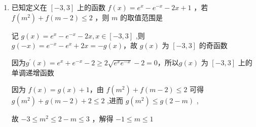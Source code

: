 \begin{enumerate}
        
        \item 已知定义在 $\left\lbrack  {-3,3}\right\rbrack$ 上的函数 $f\left( x\right)  = {{e}}^{x} - {{e}}^{-x} - {2x} + 1$ ，若 $f\left( {m}^{2}\right)  +  f\left( {m - 2}\right)  \leq  2$ ，则 $m$ 的取值范围是

        \begin{jieda}
            记 $g\left( x\right)  = {{e}}^{x} - {{e}}^{-x} - {2x},x \in  \left\lbrack  {-3,3}\right\rbrack$ ,则 $g\left( {-x}\right)  = {{e}}^{-x} - {{e}}^{x} + {2x} =  - g\left( x\right)$，故 $g\left( x\right)$ 为 $\left\lbrack  {-3,3}\right\rbrack$ 的奇函数
            
            因为${g}^{\prime }\left( x\right)  = {{e}}^{x} + {{e}}^{-x} - 2 \geq  2\sqrt{{{e}}^{x}{{e}}^{-x}} - 2 = 0$，所以$g\left( x\right)$ 为 $\left\lbrack  {-3,3}\right\rbrack$ 上的单调递增函数
            
            因为 $f\left( x\right)  = g\left( x\right)  + 1$，由 $f\left( {m}^{2}\right)  + f\left( {m - 2}\right)  \leq  2$ 可得 $g\left( {m}^{2}\right)  + g\left( {m - 2}\right)  + 2 \leq  2$ ,进而 $g\left( {m}^{2}\right)  \leq  g\left( {2 - m}\right)$ ,
            
            故 $- 3 \leq  {m}^{2} \leq  2 - m \leq  3$ ，解得 $- 1 \leq  m \leq  1$
        \end{jieda}
        

\end{enumerate}
